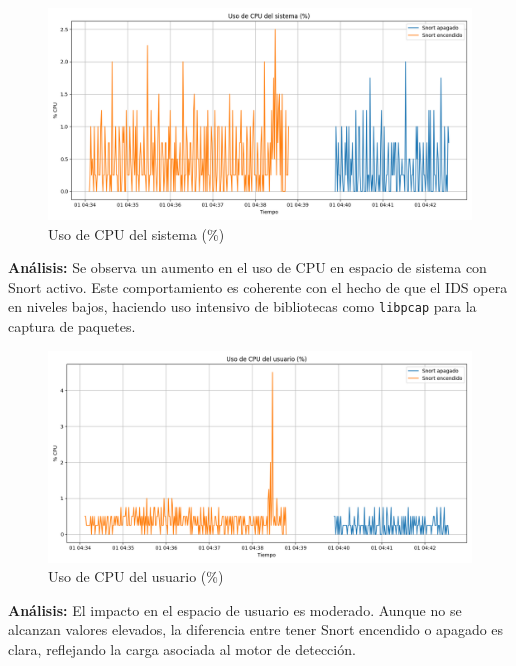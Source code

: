 \documentclass[11pt,a4paper,twoside]{report}
\begin{document}
\begin{figure}[H]
	\centering
	\includegraphics[width=\textwidth]{graficas/cpu_sys.png}
	\caption{Uso de CPU del sistema (\%)}
\end{figure}
\textbf{Análisis:} Se observa un aumento en el uso de CPU en espacio de sistema con Snort activo. Este comportamiento es coherente con el hecho de que el IDS opera en niveles bajos, haciendo uso intensivo de bibliotecas como \texttt{libpcap} para la captura de paquetes.

\begin{figure}[H]
	\centering
	\includegraphics[width=\textwidth]{graficas/cpu_usr.png}
	\caption{Uso de CPU del usuario (\%)}
\end{figure}
\textbf{Análisis:} El impacto en el espacio de usuario es moderado. Aunque no se alcanzan valores elevados, la diferencia entre tener Snort encendido o apagado es clara, reflejando la carga asociada al motor de detección.
\end{document}
